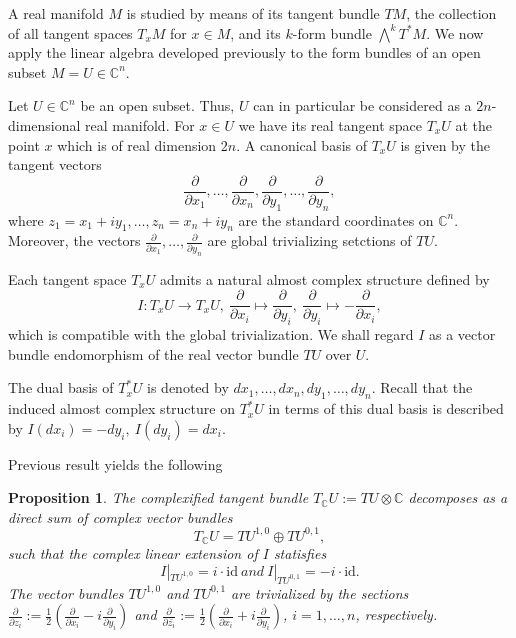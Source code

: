 \documentclass{article}
\theoremstyle{definition}
\theoremstyle{plain}
\newtheorem{proposition}[definition]{Proposition}
\begin{document}
A real manifold $ M $ is studied by means of its tangent bundle $ TM $, the collection of all tangent spaces $ T_x M $ for $ x\in M $, and its $ k $-form bundle $ \bigwedge^k T^* M $. We now apply the linear algebra developed previously to the form bundles of an open subset $ M=U\in\mathbb{C}^n $. 

Let $ U\in\mathbb{C}^n $ be an open subset. Thus, $ U $ can in particular be considered as a $ 2n $-dimensional real manifold. For $ x\in U $ we have its real tangent space $ T_x U $ at the point $ x $ which is of real dimension $ 2n $. A canonical basis of $ T_x U $ is given by the tangent vectors\[
    \frac{\partial}{\partial x_1},\dots,\frac{\partial}{\partial x_n},\frac{\partial}{\partial y_1},\dots,\frac{\partial}{\partial y_n},
\]where $ z_1=x_1+iy_1,\dots,z_n=x_n+iy_n $ are the standard coordinates on $ \mathbb{C}^n $. Moreover, the vectors $ \frac{\partial}{\partial x_1},\dots,\frac{\partial}{\partial y_n} $ are global trivializing setctions of $ TU $.

Each tangent space $ T_x U $ admits a natural almost complex structure defined by\[
    I:T_x U\rightarrow T_x U,\ \frac{\partial}{\partial x_i}\mapsto\frac{\partial}{\partial y_i},\ \frac{\partial}{\partial y_i}\mapsto -\frac{\partial}{\partial x_i},
\]which is compatible with the global trivialization. We shall regard $ I $ as a vector bundle endomorphism of the real vector bundle $ TU $ over $ U $.

The dual basis of $ T_x^* U $ is denoted by $ dx_1,\dots,dx_n,dy_1,\dots,dy_n $. Recall that the induced almost complex structure on $ T_x^* U $ in terms of this dual basis is described by $ I(dx_i)=-dy_i,\ I(dy_i)=dx_i $.

Previous result yields the following

\begin{proposition}
    The complexified tangent bundle $ T_{\mathbb{C}}U:=TU\otimes\mathbb{C} $ decomposes as a direct sum of complex vector bundles\[
        T_{\mathbb{C}}U=TU^{1,0}\oplus TU^{0,1},
    \]such that the complex linear extension of $ I $ statisfies\[
        I|_{TU^{1,0}}=i\cdot\mathrm{id}\ and\ I|_{TU^{0,1}}=-i\cdot\mathrm{id}.
    \]The vector bundles $ TU^{1,0} $ and $ TU^{0,1} $ are trivialized by the sections $ \frac{\partial}{\partial z_i}:=\frac{1}{2}(\frac{\partial}{\partial x_i}-i\frac{\partial}{\partial y_i}) $ and $ \frac{\partial}{\partial\bar{z_i}}:=\frac{1}{2}(\frac{\partial}{\partial x_i}+i\frac{\partial}{\partial y_i}) $, $ i=1,\dots,n $, respectively.
\end{proposition}
\end{document}
